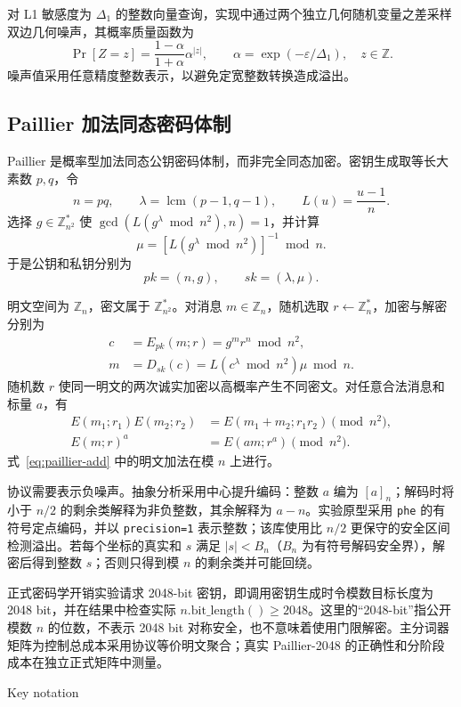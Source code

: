 对 L1 敏感度为 $\Delta_1$ 的整数向量查询，实现中通过两个独立几何随机变量之差采样双边几何噪声，其概率质量函数为
\begin{equation}
 \Pr[Z=z]=\frac{1-\alpha}{1+\alpha}\alpha^{|z|},\qquad
 \alpha=\exp(-\varepsilon/\Delta_1),\quad z\in\mathbb Z.
 \label{eq:two-sided-geometric}
\end{equation}
噪声值采用任意精度整数表示，以避免定宽整数转换造成溢出。

\subsection{Paillier 加法同态密码体制}

Paillier 是概率型加法同态公钥密码体制，而非完全同态加密\cite{paillier1999}。密钥生成取等长大素数 $p,q$，令
\begin{equation}
 n=pq,\qquad \lambda=\operatorname{lcm}(p-1,q-1),\qquad
 L(u)=\frac{u-1}{n}.
\end{equation}
选择 $g\in\mathbb Z_{n^2}^{*}$ 使 $\gcd(L(g^\lambda\bmod n^2),n)=1$，并计算
\begin{equation}
 \mu=\left[L(g^\lambda\bmod n^2)\right]^{-1}\bmod n.
\end{equation}
于是公钥和私钥分别为
\begin{equation}
 pk=(n,g),\qquad sk=(\lambda,\mu).
\end{equation}

明文空间为 $\mathbb Z_n$，密文属于 $\mathbb Z_{n^2}^{*}$。对消息 $m\in\mathbb Z_n$，随机选取 $r\leftarrow\mathbb Z_n^{*}$，加密与解密分别为
\begin{align}
 c&=E_{pk}(m;r)=g^m r^n\bmod n^2, \label{eq:paillier-enc}\\
 m&=D_{sk}(c)=L(c^\lambda\bmod n^2)\mu\bmod n. \label{eq:paillier-dec}
\end{align}
随机数 $r$ 使同一明文的两次诚实加密以高概率产生不同密文。对任意合法消息和标量 $a$，有
\begin{align}
 E(m_1;r_1)E(m_2;r_2)&=E(m_1+m_2;r_1r_2)\pmod{n^2},\label{eq:paillier-add}\\
 E(m;r)^a&=E(am;r^a)\pmod{n^2}.\label{eq:paillier-scalar}
\end{align}
式~\eqref{eq:paillier-add} 中的明文加法在模 $n$ 上进行。

协议需要表示负噪声。抽象分析采用中心提升编码：整数 $a$ 编为 $[a]_n$；解码时将小于 $n/2$ 的剩余类解释为非负整数，其余解释为 $a-n$。实验原型采用 \texttt{phe} 的有符号定点编码，并以 \texttt{precision=1} 表示整数；该库使用比 $n/2$ 更保守的安全区间检测溢出。若每个坐标的真实和 $s$ 满足 $|s|<B_n$（$B_n$ 为有符号解码安全界），解密后得到整数 $s$；否则只得到模 $n$ 的剩余类并可能回绕。

正式密码学开销实验请求 2048-bit 密钥，即调用密钥生成时令模数目标长度为 2048 bit，并在结果中检查实际 $n.\mathrm{bit\_length()}\geq2048$。这里的“2048-bit”指公开模数 $n$ 的位数，不表示 2048 bit 对称安全，也不意味着使用门限解密。主分词器矩阵为控制总成本采用协议等价明文聚合；真实 Paillier-2048 的正确性和分阶段成本在独立正式矩阵中测量。

\begin{table}
\centering
\caption{主要符号}{Key notation}

\end{table}
